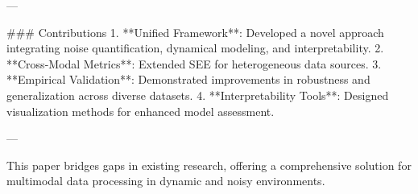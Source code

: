 ---

### Contributions  
1. **Unified Framework**: Developed a novel approach integrating noise quantification, dynamical modeling, and interpretability.  
2. **Cross-Modal Metrics**: Extended SEE for heterogeneous data sources.  
3. **Empirical Validation**: Demonstrated improvements in robustness and generalization across diverse datasets.  
4. **Interpretability Tools**: Designed visualization methods for enhanced model assessment.  

--- 

This paper bridges gaps in existing research, offering a comprehensive solution for multimodal data processing in dynamic and noisy environments.